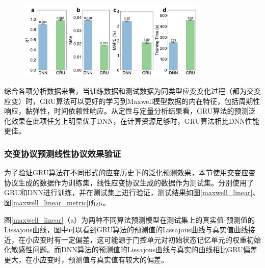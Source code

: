 \begin{figure}[htbp]
  \centering
  \includegraphics[width=0.8\textwidth]{Fig/Maxwell_sin_metric.pdf}
  \FigureBicaption{\label{maxwell_sin_metric}}{}
\end{figure}
综合各项分析数据来看，当训练数据和测试数据为同类型应变变化过程（都为交变应变）时，GRU算法可以更好的学习到Maxwell模型数据的内在特征，包括周期性响应，黏弹性，时间依赖性响应。从定性与定量分析结果看，GRU算法的预测泛化效果在此项任务上明显优于DNN，在计算资源足够时，GRU算法相比DNN性能更佳。


\subsubsection{交变协议预测线性协议效果验证}
为了验证GRU算法在不同形式的应变历史下的泛化预测效果，本节使用交变应变协议生成的数据作为训练集，线性应变协议生成的数据作为测试集。分别使用了GRU和DNN进行训练，并在测试集上进行验证，测试结果如图\ref{maxwell_linear}、图\ref{maxwell_linear_metric}所示。

图\ref{maxwell_linear}（a）为两种不同算法预测模型在测试集上的真实值-预测值的Lissajous曲线，图中可以看到GRU算法的预测值的Lissajous曲线与真实值曲线接近，在小应变时有一定偏差，这可能源于门控单元对初始状态记忆单元的权重初始化敏感性问题。而DNN算法的预测值的Lissajous曲线与真实的曲线相比GRU偏差更大，在小应变时，预测值与真实值有较大的偏差。

